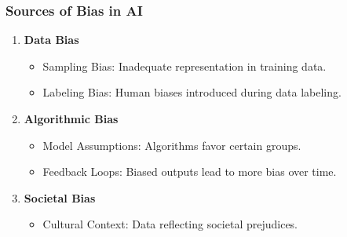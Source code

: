 \documentclass{beamer}
\begin{document}
\begin{frame}[fragile]
    \frametitle{Sources of Bias in AI}
    \begin{enumerate}
        \item \textbf{Data Bias}
            \begin{itemize}
                \item Sampling Bias: Inadequate representation in training data.
                \item Labeling Bias: Human biases introduced during data labeling.
            \end{itemize}

        \item \textbf{Algorithmic Bias}
            \begin{itemize}
                \item Model Assumptions: Algorithms favor certain groups.
                \item Feedback Loops: Biased outputs lead to more bias over time.
            \end{itemize}

        \item \textbf{Societal Bias}
            \begin{itemize}
                \item Cultural Context: Data reflecting societal prejudices.
            \end{itemize}
    \end{enumerate}
\end{frame}
\end{document}

